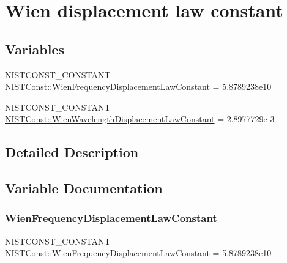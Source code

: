 \hypertarget{group___n_i_s_t_const-_wien_displacement}{}\section{Wien displacement law constant}
\label{group___n_i_s_t_const-_wien_displacement}
\subsection*{Variables}
\begin{DoxyCompactItemize}
\item 
N\+I\+S\+T\+C\+O\+N\+S\+T\+\_\+\+C\+O\+N\+S\+T\+A\+NT \mbox{\hyperlink{group___n_i_s_t_const-_wien_displacement_gaa436196a2e227da87e5138210d00ca3c}{N\+I\+S\+T\+Const\+::\+Wien\+Frequency\+Displacement\+Law\+Constant}} = 5.\+8789238e10
\item 
N\+I\+S\+T\+C\+O\+N\+S\+T\+\_\+\+C\+O\+N\+S\+T\+A\+NT \mbox{\hyperlink{group___n_i_s_t_const-_wien_displacement_gaad844adb8bf7d8300587cb2892b430d8}{N\+I\+S\+T\+Const\+::\+Wien\+Wavelength\+Displacement\+Law\+Constant}} = 2.\+8977729e-\/3
\end{DoxyCompactItemize}


\subsection{Detailed Description}


\subsection{Variable Documentation}
\mbox{\label{group___n_i_s_t_const-_wien_displacement_gaa436196a2e227da87e5138210d00ca3c}} 
\subsubsection{\texorpdfstring{Wien\+Frequency\+Displacement\+Law\+Constant}{WienFrequencyDisplacementLawConstant}}
{\footnotesize\ttfamily N\+I\+S\+T\+C\+O\+N\+S\+T\+\_\+\+C\+O\+N\+S\+T\+A\+NT N\+I\+S\+T\+Const\+::\+Wien\+Frequency\+Displacement\+Law\+Constant = 5.\+8789238e10}

